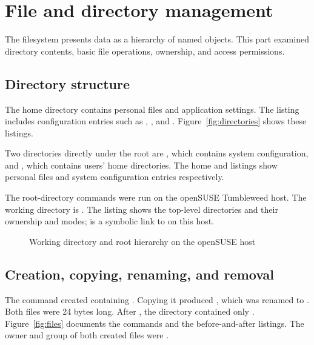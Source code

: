 \documentclass{../latex/utmreport}
\begin{document}
\chapter{File and directory management}
The filesystem presents data as a hierarchy of named objects. This part
examined directory contents, basic file operations, ownership, and access
permissions.

\section{Directory structure}
The home directory contains personal files and application settings. The
 listing includes configuration entries such as
, , and .
Figure~\ref{fig:directories} shows these listings.

Two directories directly under the root are , which contains
system configuration, and , which contains users' home
directories. The home and  listings show personal files and
system configuration entries respectively.

The root-directory commands were run on the openSUSE Tumbleweed host.
The working directory is .
The listing shows the top-level directories and their ownership and modes;
 is a symbolic link to  on this host.
\begin{figure}[H]

\caption{Working directory and root hierarchy on the openSUSE host}
\label{fig:root-directory}
\end{figure}


\section{Creation, copying, renaming, and removal}
The command  created  containing
. Copying it produced , which
was renamed to . Both files were 24 bytes long.
After , the directory contained only .
Figure~\ref{fig:files} documents the commands and the before-and-after
listings. The owner and group of both created files were .
\end{document}
